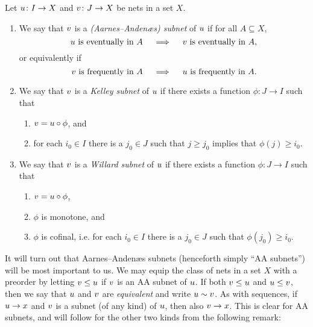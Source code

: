 \documentclass[article, a4paper, 11pt, oneside]{memoir}
\numberwithin{equation}{chapter}
\theoremstyle{nonumberplain}
\begin{document}
\begin{definition}[Subnets]
    \label{def:subnets}
    Let $u \colon I \to X$ and $v \colon J \to X$ be nets in a set $X$.
    
    \begin{enumerate}
        \item We say that $v$ is a \emph{(Aarnes--Andenæs) subnet} of $u$ if for all $A \subseteq X$,
        \begin{equation*}
            \text{$u$ is eventually in $A$}
            \quad \implies \quad
            \text{$v$ is eventually in $A$},
        \end{equation*}
        or equivalently if
        \begin{equation*}
            \text{$v$ is frequently in $A$}
            \quad \implies \quad
            \text{$u$ is frequently in $A$}.
        \end{equation*}

        \item We say that $v$ is a \emph{Kelley subnet} of $u$ if there exists a function $\phi \colon J \to I$ such that
        \begin{enumerate}
            \item $v = u \circ \phi$, and
            \item for each $i_0 \in I$ there is a $j_0 \in J$ such that $j \geq j_0$ implies that $\phi(j) \geq i_0$.
        \end{enumerate}

        \item We say that $v$ is a \emph{Willard subnet} of $u$ if there exists a function $\phi \colon J \to I$ such that
        \begin{enumerate}
            \item $v = u \circ \phi$,
            \item $\phi$ is monotone, and
            \item $\phi$ is cofinal, i.e. for each $i_0 \in I$ there is a $j_0 \in J$ such that $\phi(j_0) \geq i_0$.
        \end{enumerate}
    \end{enumerate}
\end{definition}
%
It will turn out that Aarnes--Andenæs subnets (henceforth simply \enquote{AA subnets}) will be most important to us. We may equip the class of nets in a set $X$ with a preorder by letting $v \leq u$ if $v$ is an AA subnet of $u$. If both $v \leq u$ and $u \leq v$, then we say that $u$ and $v$ are \emph{equivalent} and write $u \sim v$. As with sequences, if $u \to x$ and $v$ is a subnet (of any kind) of $u$, then also $v \to x$. This is clear for AA subnets, and will follow for the other two kinds from the following remark:
\end{document}
